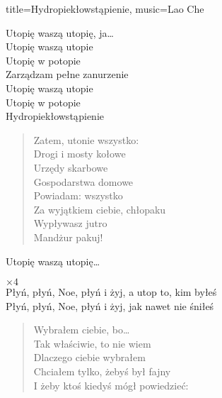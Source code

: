 \begin{song}{title={Hydropiekłowstąpienie}, music={Lao Che}}
\begin{multicols}{2}
\begin{chorus}
        Utopię waszą utopię, ja\ldots \smallskip \\
        Utopię waszą utopie \\
        Utopię w potopie \\
        Zarządzam pełne zanurzenie \smallskip \\
        Utopię waszą utopie \\
        Utopię w potopie \\
        Hydropiekłowstąpienie
    \end{chorus}
    \begin{verse}
        Zatem, utonie wszystko: \smallskip \\
        Drogi i mosty kołowe \\
        Urzędy skarbowe \\
        Gospodarstwa domowe \smallskip \\
        Powiadam: wszystko \\
        Za wyjątkiem ciebie, chłopaku \\
        Wypływasz jutro \\
        Mandżur pakuj!
    \end{verse}
    \begin{chorus}
        Utopię waszą utopię\ldots
    \end{chorus}
    \begin{interlude}
            $\times 4$ \medskip \\
        Płyń, płyń, Noe, płyń i żyj, a utop to, kim byłeś \\
        Płyń, płyń, Noe, płyń i żyj, jak nawet nie śniłeś
    \end{interlude}
    \begin{verse}
        Wybrałem ciebie, bo\ldots \\
        Tak właściwie, to nie wiem \\
        Dlaczego ciebie wybrałem \smallskip \\
        Chciałem tylko, żebyś był fajny \\
        I żeby ktoś kiedyś mógł powiedzieć: \smallskip \\
    \end{verse}
    \begin{chorus}

\end{chorus}
\end{multicols}
\end{song}
